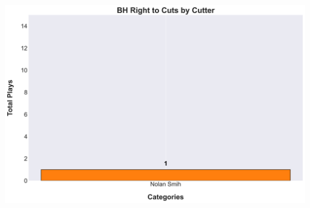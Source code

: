 \documentclass[a4paper,12pt]{article}
\begin{document}
\begin{table}[H]
{\begin{minipage}[t]{0.6\textwidth}
{\begin{tabular}
            \bottomrule
        \end{tabular}
        } %
    \end{minipage}
    } %
    \hfill %
    \begin{minipage}[c]{0.35\textwidth} %
        \flushright
        \includegraphics[width=\textwidth, height=.14\textheight]{images/PNR_PassRightCutsPlayer_Freq.png} %
    \end{minipage}
\end{table}

\vspace{-1em} %
\vspace{-1em} %
\end{document}
